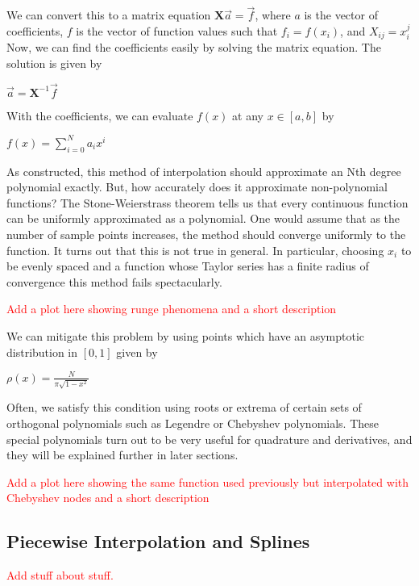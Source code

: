 \documentclass[12pt,letterpaper]{article}
\begin{document}
\indent We can convert this to a matrix equation $\boldsymbol{X}\overrightarrow{a} = \overrightarrow{f}$, where $a$ is the vector of coefficients, $f$ is the vector of function values such that $f_i = f(x_i)$, and $X_{ij} = x_i^j$ Now, we can find the coefficients easily by solving the matrix equation. The solution is given by 
\begin{center}
$\overrightarrow{a} = \boldsymbol{X}^{-1} \overrightarrow{f}$
\end{center}
With the coefficients, we can evaluate $f(x)$ at any $x \in [a,b]$ by
\begin{center}
$f(x) = \sum_{i=0}^{N} a_i x^i$ 
\end{center}

\indent As constructed, this method of interpolation should approximate an Nth degree polynomial exactly. But, how accurately does it approximate non-polynomial functions? The Stone-Weierstrass theorem tells us that every continuous function can be uniformly approximated as a polynomial. One would assume that as the number of sample points increases, the method should converge uniformly to the function. It turns out that this is not true in general. In particular, choosing $x_i$ to be evenly spaced and a function whose Taylor series has a finite radius of convergence this method fails spectacularly.
\begin{center}
\textcolor{red}{Add a plot here showing runge phenomena and a short description}
\end{center}

\indent We can mitigate this problem by using points which have an asymptotic distribution in $[0,1]$ given by
\begin{center}
$\rho(x) = \frac{N}{\pi \sqrt{1 - x^2}}$
\end{center}

\indent Often, we satisfy this condition using roots or extrema of certain sets of orthogonal polynomials such as Legendre or Chebyshev polynomials. These special polynomials turn out to be very useful for quadrature and derivatives, and they will be explained further in later sections.

\begin{center}
\textcolor{red}{Add a plot here showing the same function used previously but interpolated with Chebyshev nodes and a short description}
\end{center}

\subsection{Piecewise Interpolation and Splines}
\begin{center}
\textcolor{red}{Add stuff about stuff.}
\end{center}
\end{document}
